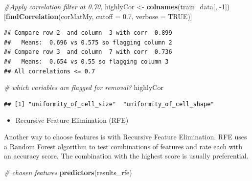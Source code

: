 \documentclass[]{article}
\newenvironment{Shaded}{\begin{snugshade}}{\end{snugshade}}
\newcommand{\KeywordTok}[1]{\textcolor[rgb]{0.13,0.29,0.53}{\textbf{{#1}}}}
\newcommand{\DataTypeTok}[1]{\textcolor[rgb]{0.13,0.29,0.53}{{#1}}}
\newcommand{\DecValTok}[1]{\textcolor[rgb]{0.00,0.00,0.81}{{#1}}}
\newcommand{\FloatTok}[1]{\textcolor[rgb]{0.00,0.00,0.81}{{#1}}}
\newcommand{\StringTok}[1]{\textcolor[rgb]{0.31,0.60,0.02}{{#1}}}
\newcommand{\CommentTok}[1]{\textcolor[rgb]{0.56,0.35,0.01}{\textit{{#1}}}}
\newcommand{\OtherTok}[1]{\textcolor[rgb]{0.56,0.35,0.01}{{#1}}}
\newcommand{\NormalTok}[1]{{#1}}
\providecommand{\tightlist}{%
  \setlength{\itemsep}{0pt}\setlength{\parskip}{0pt}}
\begin{document}
\begin{Shaded}
\begin{Highlighting}[]
\CommentTok{#Apply correlation filter at 0.70,}
\NormalTok{highlyCor <-}\StringTok{ }\KeywordTok{colnames}\NormalTok{(train_data[, -}\DecValTok{1}\NormalTok{])[}\KeywordTok{findCorrelation}\NormalTok{(corMatMy, }\DataTypeTok{cutoff =} \FloatTok{0.7}\NormalTok{, }\DataTypeTok{verbose =} \OtherTok{TRUE}\NormalTok{)]}
\end{Highlighting}
\end{Shaded}

\begin{verbatim}
## Compare row 2  and column  3 with corr  0.899 
##   Means:  0.696 vs 0.575 so flagging column 2 
## Compare row 3  and column  7 with corr  0.736 
##   Means:  0.654 vs 0.55 so flagging column 3 
## All correlations <= 0.7
\end{verbatim}

\begin{Shaded}
\begin{Highlighting}[]
\CommentTok{# which variables are flagged for removal?}
\NormalTok{highlyCor}
\end{Highlighting}
\end{Shaded}

\begin{verbatim}
## [1] "uniformity_of_cell_size"  "uniformity_of_cell_shape"
\end{verbatim}

\begin{Shaded}
\end{Shaded}

\begin{itemize}
\tightlist
\item
  Recursive Feature Elimination (RFE)
\end{itemize}

Another way to choose features is with Recursive Feature Elimination.
RFE uses a Random Forest algorithm to test combinations of features and
rate each with an accuracy score. The combination with the highest score
is usually preferential.

\begin{Shaded}
\begin{Highlighting}[]
\CommentTok{# chosen features}
\KeywordTok{predictors}\NormalTok{(results_rfe)}
\end{Highlighting}
\end{Shaded}
\end{document}
